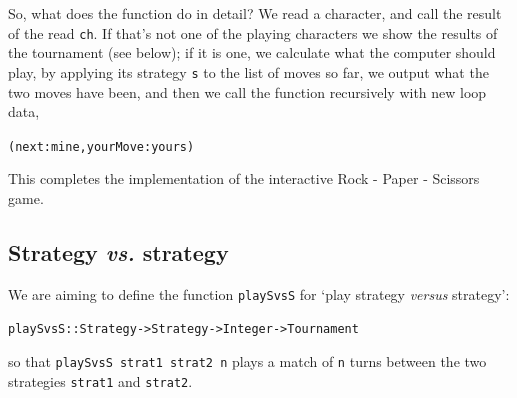 So, what does the function do in detail? We read a character, and call the result of the  read \texttt{ch}. If that's not one of the playing characters we show the results of the tournament (see below); if it is one, we calculate what the computer should play, by applying its strategy \texttt{s} to the list of moves so far, we output what the two moves have been, and then we call the function recursively with new loop data,
\begin{alltt}
(next:mine, yourMove:yours)
\end{alltt}
This completes the implementation of the interactive Rock - Paper - Scissors game.

\begin{figure}[t]
\end{figure}


\subsection*{Strategy \emph{vs.} strategy}

We are aiming to define the function \texttt{playSvsS} for `play strategy \emph{versus} strategy':
\begin{alltt}
playSvsS :: Strategy -> Strategy -> Integer -> Tournament
\end{alltt}
so that \texttt{playSvsS strat1 strat2 n} plays a match of \texttt{n} turns between the two strategies \texttt{strat1} and \texttt{strat2}. 

